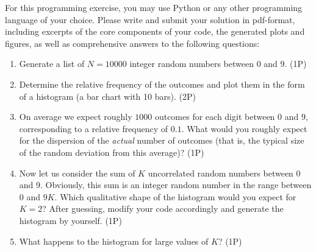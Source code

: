 \begin{Problem}
	For this programming exercise, you may use Python or any other programming language of your choice. Please write and submit your solution in pdf-format, including excerpts of the core components of your code, the generated plots and figures, as well as comprehensive answers to the following questions:
	
	\begin{enumerate}
		\item[(a)] Generate a list of $N = 10000$ integer random numbers between $0$ and $9$. \hfill (1P)
		
		\item[(b)] Determine the relative frequency of the outcomes and plot them in the form of a histogram (a bar chart with 10 bars). \hfill (2P)
		
		\item[(c)] On average we expect roughly $1000$ outcomes for each digit between $0$ and $9$, corresponding to a relative frequency of $0.1$. What would you roughly expect for the dispersion of the \emph{actual} number of outcomes (that is, the typical size of the random deviation from this average)? \hfill (1P)
		
		\item[(d)] Now let us consider the sum of $K$ uncorrelated random numbers between $0$ and $9$. Obviously, this sum is an integer random number in the range between $0$ and $9K$. Which qualitative shape of the histogram would you expect for $K = 2$? After guessing, modify your code accordingly and generate the histogram by yourself. \hfill (1P)
		
		\item[(e)] What happens to the histogram for large values of $K$? \hfill (1P)
		
	\end{enumerate}
\end{Problem}

